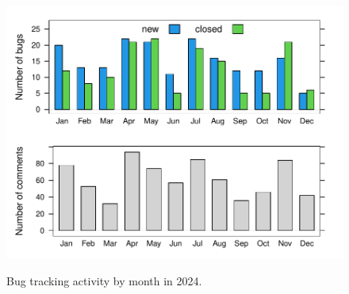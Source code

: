 \begin{figure}

{\centering \includegraphics[width=0.8\linewidth,alt={Barplots of the number of opened bugs, closed bugs and comments by month.}]{figures/bzstats-mon} 

}

\caption{Bug tracking activity by month in 2024.}\label{fig:bzstats-mon}
\end{figure}


\address{%
Tomas Kalibera\\
R Core Team\\%
Prague, Czechia\\
%
%
\textit{ORCiD: \href{https://orcid.org/0000-0002-7435-734X}{0000-0002-7435-734X}}\\%
\href{mailto:Tomas.Kalibera@R-project.org}{\nolinkurl{Tomas.Kalibera@R-project.org}}%
}

\address{%
Sebastian Meyer\\
Friedrich-Alexander-Universität Erlangen-Nürnberg\\%
Erlangen, Germany\\
%
%
\textit{ORCiD: \href{https://orcid.org/0000-0002-1791-9449}{0000-0002-1791-9449}}\\%
\href{mailto:Sebastian.Meyer@R-project.org}{\nolinkurl{Sebastian.Meyer@R-project.org}}%
}
